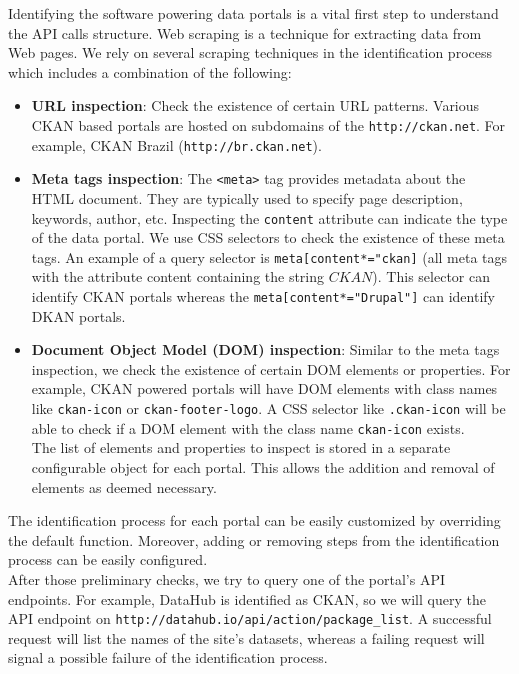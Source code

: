 \documentclass[runningheads,a4paper]{llncs}
\begin{document}
Identifying the software powering data portals is a vital first step to understand the API calls structure. Web scraping is a technique for extracting data from Web pages. We rely on several scraping techniques in the identification process which includes a combination of the following:

\begin{itemize}
  \item \textbf{URL inspection}: Check the existence of certain URL patterns. Various CKAN based portals are hosted on subdomains of the \texttt{http://ckan.net}. For example, CKAN Brazil (\texttt{http://br.ckan.net}).
  \item \textbf{Meta tags inspection}: The \texttt{<meta>} tag provides metadata about the HTML document. They are typically used to specify page description, keywords, author, etc. Inspecting the \texttt{content} attribute can indicate the type of the data portal. We use CSS selectors to check the existence of these meta tags. An example of a query selector is \texttt{meta[content*="ckan]} (all meta tags with the attribute content containing the string $CKAN$). This selector can identify CKAN portals whereas the \texttt{meta[content*="Drupal"]} can identify DKAN portals.
  \item \textbf{Document Object Model (DOM) inspection}: Similar to the meta tags inspection, we check the existence of certain DOM elements or properties. For example, CKAN powered portals will have DOM elements with class names like \texttt{ckan-icon} or \texttt{ckan-footer-logo}. A CSS selector like \texttt{.ckan-icon} will be able to check if a DOM element with the class name \texttt{ckan-icon} exists.\\
  The list of elements and properties to inspect is stored in a separate configurable object for each portal. This allows the addition and removal of elements as deemed necessary.
\end{itemize}

The identification process for each portal can be easily customized by overriding the default function. Moreover, adding or removing steps from the identification process can be easily configured.\\
After those preliminary checks, we try to query one of the portal's API endpoints. For example, DataHub is identified as CKAN, so we will query the API endpoint on \texttt{http://datahub.io/api/action/package\_list}. A successful request will list the names of the site's datasets, whereas a failing request will signal a possible failure of the identification process.
\end{document}
